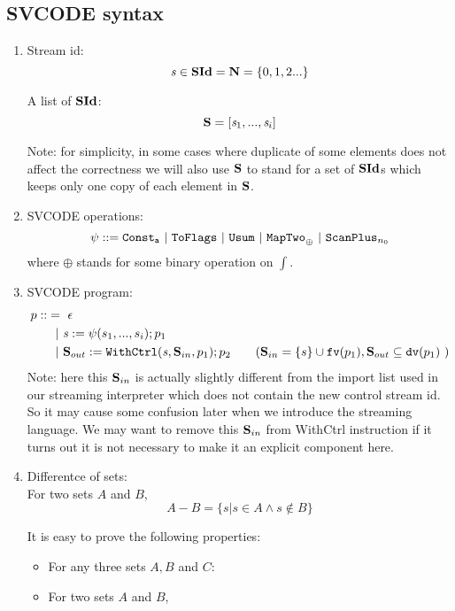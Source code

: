 \subsection{SVCODE syntax}
\begin{enumerate}[(1)]
\item Stream id: $$\s \in \SId = \*{N} = \{0,1,2...\}$$

A list of $\SId$: 
$$\S = [\s_1,..., \s_i] $$

Note: for simplicity, in some cases where duplicate of some elements does not affect the correctness
we will also use $\S$ to stand for a set of $\SId$s which keeps only one copy of each element in $\S$.

\item SVCODE operations: $$\psi ::= \consta{a} \ | \ \toflag
\ | \ \usum \ | \ \maptwo{\oplus} \ | \ \scan_{n_0} $$
where $\oplus$ stands for some binary operation on $\int$. \\


\item SVCODE program: 
\begin{align*}
	p :: & = \ \epsilon \\ 
         &\ \ | \ \sdef{\s}{\psi(s_1,...,s_i)}; p_1  \\
         &\ \ | \ \withctrl{\s}{p_1}{\Sin}{\Sout}; p_2   \tag{$\Sin  = \{s\} \cup \FV{p_1}, \Sout \subseteq \dv{p_1} $ }\\
\end{align*}
Note: here this $\Sin$ is actually slightly different from the import list used in our streaming interpreter which does not contain the new control stream id. 
So it may cause some confusion later when we introduce the streaming language.
We may want to remove this $\Sin$ from WithCtrl instruction if it turns out it is not necessary to make it an explicit component here.

\item Differentce of sets: \\
For two sets $A$ and $B$, 
\[ A -B = \{s | s \in A \wedge s \notin B\} \]

It is easy to prove the following properties: 
 \begin{itemize}
 	\item For any three sets $A,B$ and $C$: 
 	\item For two sets $A$ and $B$,
 	
 \end{itemize}


\end{enumerate}
